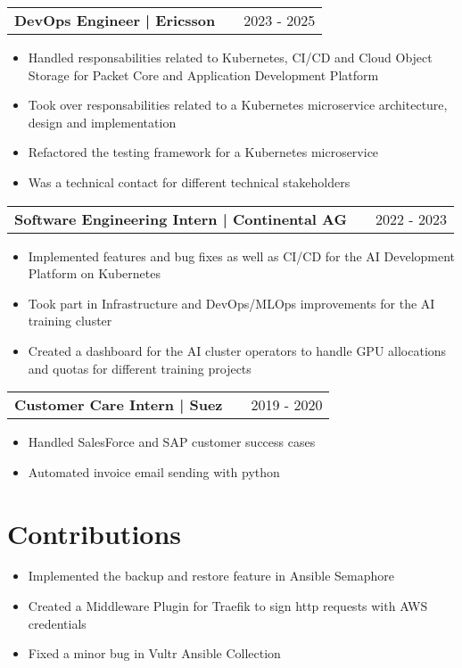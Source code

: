 \documentclass[a4paper,11pt]{article}
\makeatletter
\newenvironment{joblong}[2]
    {
    \begin{tabularx}{\linewidth}{@{}l X r@{}}
    \textbf{#1} & \hfill &  #2 \\[3.75pt]
    \end{tabularx}
    \begin{minipage}[t]{\linewidth}
    \begin{itemize}[nosep,after=\strut, leftmargin=1em, itemsep=2pt,label=--]
    }
    {
    \end{itemize}
    \end{minipage}    
    }
\makeatother
\begin{document}
\begin{joblong}{DevOps Engineer | Ericsson }{2023 - 2025}
\item Handled responsabilities related to Kubernetes, CI/CD and Cloud Object Storage for Packet Core and Application Development Platform
\item Took over responsabilities related to a Kubernetes microservice architecture, design and implementation
\item Refactored the testing framework for a Kubernetes microservice
\item Was a technical contact for different technical stakeholders
\end{joblong}

\begin{joblong}{Software Engineering Intern | Continental AG }{2022 - 2023}
\item Implemented features and bug fixes as well as CI/CD for the AI Development Platform on Kubernetes
\item Took part in Infrastructure and DevOps/MLOps improvements for the AI training cluster
\item Created a dashboard for the AI cluster operators to handle GPU allocations and quotas for different training projects
\end{joblong}

\begin{joblong}{Customer Care Intern | Suez}{2019 - 2020}
\item Handled SalesForce and SAP customer success cases
\item Automated invoice email sending with python
\end{joblong}    
\vspace{-1em} 

\section{Contributions}
\begin{itemize}[nosep,after=\strut, leftmargin=1em, itemsep=2pt,label=--]
\item Implemented the backup and restore feature in Ansible Semaphore \href{https://github.com/semaphoreui/semaphore/pull/1748}{\faGithub}
\item Created a Middleware Plugin for Traefik to sign http requests with AWS credentials \href{https://plugins.traefik.io/plugins/66c3dc9756a08f9dd36344f5/aws-sigv4-auth}{\faGlobe} \href{https://github.com/samerbahri98/sigv4middleware}{\faGithub}
\item Fixed a minor bug in Vultr Ansible Collection \href{https://github.com/vultr/ansible-collection-vultr/pull/106}{\faGithub}
\end{itemize}
\end{document}
